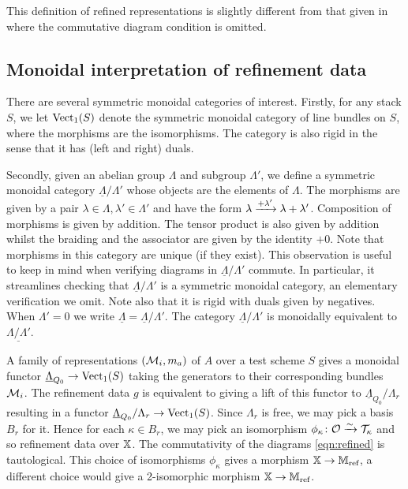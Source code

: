 \documentclass[12pt]{amsart}
\begin{document}
\begin{remark}
This definition of refined representations is slightly different from that given in \cite[Definition 3.2]{Abd} where the commutative diagram condition is omitted.
\end{remark}

\subsection{Monoidal interpretation of refinement data}
There are several symmetric monoidal categories of interest. 
Firstly, for any stack $S$, we let $\operatorname{Vect}_1 (S)$ denote the symmetric monoidal category of line bundles on $S$, where the morphisms are the isomorphisms. 
The category is also rigid in the sense that it has (left and right) duals. 

Secondly, given an abelian group $\Lambda$ and subgroup $\Lambda'$, we define a symmetric monoidal category $\underline{\Lambda}/\Lambda'$ whose objects are the elements of $\Lambda$.
The morphisms are given by a pair $\lambda \in \Lambda, \lambda' \in \Lambda'$ and have the form $\lambda \xrightarrow{+\lambda'} \lambda + \lambda'$. 
Composition of morphisms is given by addition. The tensor product is also given by addition whilst the braiding and the associator are given by the identity $+0$. Note that morphisms in this category are unique (if they exist). 
This observation is useful to keep in mind when verifying diagrams in $\underline{\Lambda}/\Lambda'$ commute. 
In particular, it streamlines checking that $\underline{\Lambda}/\Lambda'$ is a symmetric monoidal category, an elementary verification we omit. Note also that it is rigid with duals given by negatives.
When $\Lambda' = 0$ we write $\underline{\Lambda} = \underline{\Lambda}/\Lambda'$.
The category $\underline{\Lambda}/\Lambda'$ is monoidally equivalent to $\underline{\Lambda/\Lambda'}$.

A family of representations $(\mathcal{M}_i,  m_a)$ of $A$ over a test scheme $S$ gives a monoidal functor $\underline{\Lambda}_{Q_0} \rightarrow \operatorname{Vect}_1(S)$ taking the generators to their corresponding bundles $\mathcal{M}_i$.
The refinement data $g$ is equivalent to giving a lift of this functor to $\underline{\Lambda}_{Q_0}/\Lambda_r$ resulting in a functor $\underline{\Lambda}_{Q_0}/\Lambda_r \rightarrow \operatorname{Vect}_1(S)$.
Since $\Lambda_r$ is free, we may pick a basis $B_r$ for it. 
Hence for each $\kappa \in B_r$, we may pick an isomorphism $\phi_{\kappa} \colon \mathcal{O} \xrightarrow{\sim} \mathcal{T}_{\kappa}$ and so refinement data over $\mathbb{X}$.
The commutativity of the diagrams \ref{eqn:refined} is tautological.
This choice of isomorphisms $\phi_\kappa$ gives a morphism $\mathbb{X} \rightarrow \mathbb{M}_\text{ref}$, a different choice would give a 2-isomorphic morphism $\mathbb{X} \rightarrow \mathbb{M}_\text{ref}$.
\end{document}
